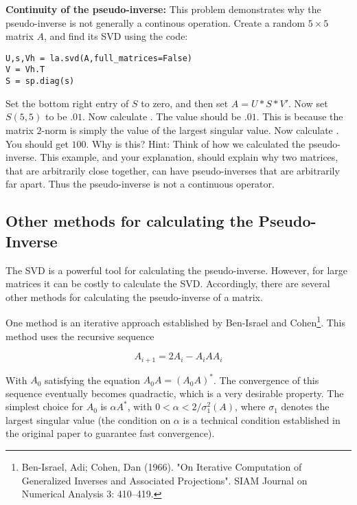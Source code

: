 \begin{problem}
{\bf Continuity of the pseudo-inverse:} This problem demonstrates why the pseudo-inverse is not generally a continous operation. Create a random $5 \times 5$ matrix $A$, and find its SVD using the code:
\begin{lstlisting}[style=python]
U,s,Vh = la.svd(A,full_matrices=False)
V = Vh.T
S = sp.diag(s)
\end{lstlisting}
Set the bottom right entry of $S$ to zero, and then set $A = U*S*V'$. Now set $S(5,5)$ to be $.01$. Now calculate . The value should be $.01$. This is because the matrix $2$-norm is simply the value of the largest singular value. Now calculate . You should get $100$. Why is this? Hint: Think of how we calculated the pseudo-inverse. This example, and your explanation, should explain why two matrices, that are arbitrarily close together, can have pseudo-inverses that are arbitrarily far apart. Thus the pseudo-inverse is not a continuous operator.
\end{problem}

\subsection*{Other methods for calculating the Pseudo-Inverse}

The SVD is a powerful tool for calculating the pseudo-inverse. However, for large matrices it can be costly to calculate the SVD. Accordingly, there are several other methods for calculating the pseudo-inverse of a matrix.

One method is an iterative approach established by Ben-Israel and Cohen\footnote{Ben-Israel, Adi; Cohen, Dan (1966). "On Iterative Computation of Generalized Inverses and Associated Projections". SIAM Journal on Numerical Analysis 3: 410–419.}. This method uses the recursive sequence

\[
A_{i+1} = 2A_i - A_i A A_i
\]

With $A_0$ satisfying the equation $A_0 A = (A_0 A)^*$. The convergence of this sequence eventually becomes quadractic, which is a very desirable property. The simplest choice for $A_0$ is $\alpha A^*$, with $0 < \alpha < 2/\sigma_1^2(A)$, where $\sigma_1$ denotes the largest singular value (the condition on $\alpha$ is a technical condition established in the original paper to guarantee fast convergence).

